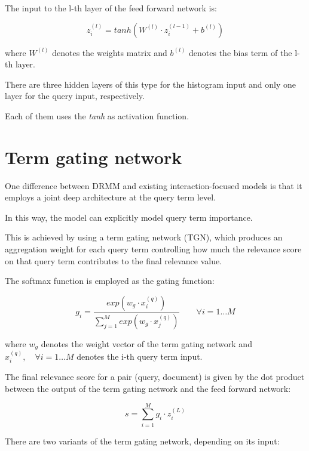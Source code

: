 The input to the l-th layer of the feed forward network is:

\begin{equation}
\label{eq:lthdenselayer}
\tag{Input to the l-th layer of ffmn}
z_i^{(l)} = tanh(W^{(l)} \cdot z_i^{(l-1)} + b^{(l)})
\end{equation}

where $W^{(l)}$ denotes the weights matrix and $b^{(l)}$ denotes
the bias term of the l-th layer.

There are three hidden layers of this type for the histogram input and only one layer for the query input, respectively.

Each of them uses the \textit{tanh} as activation function.

\section{Term gating network}

One difference between DRMM and existing interaction-focused models
is that it employs a joint deep architecture at the query term level.

In this way, the model can explicitly model query term importance.

This is achieved by using a term gating network (TGN), which produces an
aggregation weight for each query term controlling how much the
relevance score on that query term contributes to the final relevance value.

The softmax function is employed as the gating function:

\begin{equation}
\label{eq:aggscore}
\tag{Aggregation weight for TGN}
g_i = \frac{exp(w_g \cdot x_i^{(q)})}{\sum_{j=1}^M exp(w_g \cdot x_j^{(q)})} \qquad \forall i = 1 \dots M
\end{equation}

where $w_g$ denotes the weight vector of the term gating network and $x_i^{(q)},
\quad \forall i = 1 \dots M$ denotes the i-th query term input.

The final relevance score for a pair (query, document) is given by the dot product between the output of the term gating network and the feed forward network:

\begin{equation}
\label{eq:drmm_score}
\tag{Relevance score for a pair (q, d)}
s = \sum_{i=1}^{M}g_i \cdot z_i^{(L)}
\end{equation}

There are two variants of the term gating network, depending on its input:

